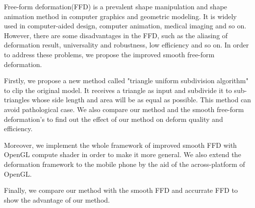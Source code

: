 

\begin{eabstract}
    Free-form deformation(FFD) is a prevalent shape manipulation and shape animation method in computer graphics and geometric modeling. It is widely used in computer-aided design, computer animation, medical imaging and so on. However, there are some disadvantages in the FFD, such as the aliasing of deformation result, universality and robustness, low efficiency and so on. In order to address these problems, we propose the improved smooth free-form deformation.

    Firstly, we propose a new method called "triangle uniform subdivision algorithm" to clip the original model. It receives a triangle as input and subdivide it to sub-triangles whose side length and area will be as equal as possible. This method can avoid pathological case. We also compare our method and the smooth free-form deformation's to find out the effect of our method on deform quality and efficiency.

    Moreover, we implement the whole framework of improved smooth FFD with OpenGL compute shader in order to make it more general. We also extend the deformation framework to the mobile phone by the aid of the across-platform of OpenGL.

    Finally, we compare our method with the smooth FFD and accurrate FFD to show the advantage of our method.
\end{eabstract}

